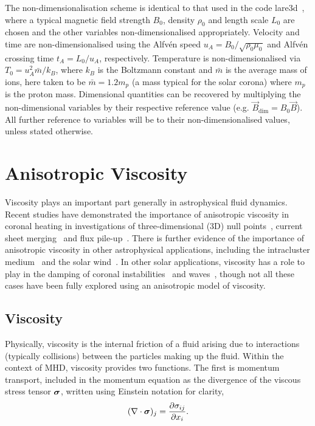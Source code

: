 The non-dimensionalisation scheme is identical to that used in the code lare3d~\cite{arberStaggeredGridLagrangian2001}, where a typical magnetic field strength $B_0$, density $\rho_0$ and length scale $L_0$ are chosen and the other variables non-dimensionalised appropriately. Velocity and time are
non-dimensionalised using the Alfv\'en speed $u_A = B_0 / \sqrt{\rho_0
  \mu_0}$ and Alfv\'en crossing time $t_A = L_0/u_A$,
respectively. Temperature is non-dimensionalised via $T_0 = u_A^2
\bar{m} / k_B$, where $k_B$ is the Boltzmann constant and $\bar{m}$ is
the average mass of ions, here taken to be $\bar{m} = 1.2m_p$ (a mass
typical for the solar corona) where $m_p$ is the proton mass. Dimensional quantities can be recovered by multiplying the non-dimensional variables by their respective reference value (e.g. $\vec{B}_{\dim} = B_0 \vec{B}$). All further reference to variables will be to their non-dimensionalised values, unless stated otherwise.

\section{Anisotropic Viscosity}

Viscosity plays an important part generally in astrophysical fluid dynamics. Recent studies have demonstrated the importance of anisotropic viscosity in coronal heating in investigations of three-dimensional (3D) null points~\cite{craigViscousDissipation3D2013}, current sheet merging~\cite{armstrongViscoResistiveDissipation2013} and flux pile-up~\cite{litvinenkoViscousEnergyDissipation2005}. There is further evidence of the importance of anisotropic viscosity in other astrophysical applications, including the intracluster medium~\cite{zuhoneEffectAnisotropicViscosity2014, parrishEffectsAnisotropicViscosity2012a} and the solar wind~\cite{baleMagneticFluctuationPower2009}. In other solar applications, viscosity has a role to play in the damping of coronal instabilities~\cite{howsonEffectsResistivityViscosity2017} and waves~\cite{vranjesViscosityEffectsWaves2014, erdelyiResonantAbsorptionAlfven1995a, rudermanSlowSurfaceWave2000a}, though not all these cases have been fully explored using an anisotropic model of viscosity.

\subsection{Viscosity}

Physically, viscosity is the internal friction of a fluid arising due to interactions (typically collisions) between the particles making up the fluid. Within the context of MHD, viscosity provides two functions. The first is momentum transport, included in the momentum equation as the divergence of the viscous stress tensor ${\bm \sigma}$, written using Einstein notation for clarity,
\begin{equation}
  \label{eq:viscous_momenum_transport}
  (\nabla \cdot {\bm \sigma})_j = \frac{\partial \sigma_{ij}}{\partial x_i}.
\end{equation}

